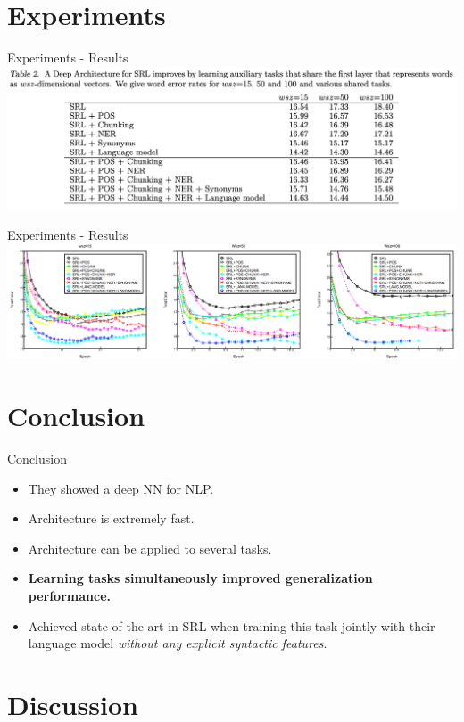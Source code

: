 \documentclass[handout]{beamer} %
\begin{document}
  \section{Experiments}
  \begin{frame}{Experiments - Results}
      \hspace{-0.5cm}\includegraphics[scale=0.18]{imgs/results.png}
  \end{frame}
  \begin{frame}{Experiments - Results}
      \hspace{-0.6cm}\includegraphics[scale=0.18]{imgs/resultgraphs.png}
  \end{frame}
  \section{Conclusion}
  \begin{frame}{Conclusion}
      \begin{itemize}
          \item They showed a deep NN for NLP.
          \item Architecture is extremely fast.
          \item Architecture can be applied to several tasks.
          \item \textbf{Learning tasks simultaneously improved generalization
                  performance.}
          \item Achieved state of the art in SRL when training this task jointly
              with their language model \textit{without any explicit syntactic
              features}.
      \end{itemize}
  \end{frame}

  \section{Discussion}



\end{document}
